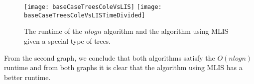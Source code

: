\begin{figure}
	\texttt{[image: baseCaseTreesColeVsLIS]}
	\texttt{[image: baseCaseTreesColeVsLISTimeDivided]}
	\caption{The runtime of the $nlogn$ algorithm and the algorithm using MLIS given a special type of trees.}
	\label{baseCaseTreesColeVsLIS}
\end{figure}

From the second graph, we conclude that both algorithms satisfy the $O(nlogn)$ runtime and from both graphs it is clear that the algorithm using MLIS has a better runtime.



